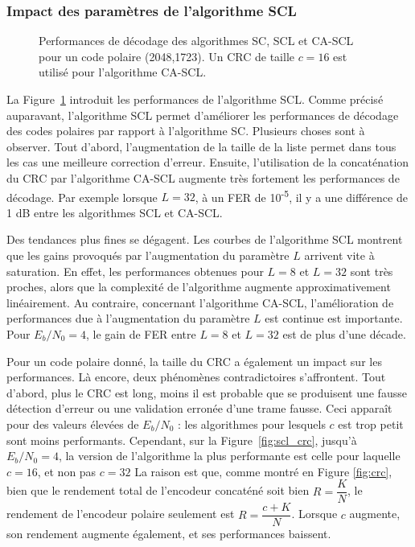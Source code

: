 \subsubsection{Impact des paramètres de l'algorithme SCL}

\begin{figure}[ht]
  \centering
  
  \caption{Performances de décodage des algorithmes SC, SCL et CA-SCL pour un code polaire (2048,1723). Un CRC de taille $c=16$ est utilisé pour l'algorithme CA-SCL.}
  \label{fig:scl_l}
\end{figure}
La Figure~\ref{fig:scl_l} introduit les performances de l'algorithme SCL. Comme précisé auparavant, l'algorithme SCL permet d'améliorer les performances de décodage des codes polaires par rapport à l'algorithme SC.
Plusieurs choses sont à observer. Tout d'abord, l'augmentation de la taille de la liste permet dans tous les cas une meilleure correction d'erreur. Ensuite, l'utilisation de la concaténation du CRC par l'algorithme CA-SCL augmente très fortement les performances de décodage. Par exemple lorsque $L=32$, à un FER de 10\textsuperscript{-5}, il y a une différence de 1 dB entre les algorithmes SCL et CA-SCL.

Des tendances plus fines se dégagent. Les courbes de l'algorithme SCL montrent que les gains provoqués par l'augmentation du paramètre $L$ arrivent vite à saturation. En effet, les performances obtenues pour $L=8$ et $L=32$ sont très proches, alors que la complexité de l'algorithme augmente approximativement linéairement. Au contraire, concernant l'algorithme CA-SCL, l'amélioration de performances due à l'augmentation du paramètre $L$ est continue est importante. Pour $E_b/N_0=4$, le gain de FER entre $L=8$ et $L=32$ est de plus d'une décade.

Pour un code polaire donné, la taille du CRC a également un impact sur les performances. Là encore, deux phénomènes contradictoires s'affrontent. 
Tout d'abord, plus le CRC est long, moins il est probable que se produisent une fausse détection d'erreur ou une validation erronée d'une trame fausse. Ceci apparaît pour des valeurs élevées de $E_b/N_0$ : les algorithmes pour lesquels $c$ est trop petit sont moins performants.
Cependant, sur la Figure~\ref{fig:scl_crc}, jusqu'à $E_b/N_0=4$, la version de l'algorithme la plus performante est celle pour laquelle $c=16$, et non pas $c=32$
La raison est que, comme montré en Figure \ref{fig:crc}, bien que le rendement total de l'encodeur concaténé soit bien $R=\dfrac{K}{N}$, le rendement de l'encodeur polaire seulement est $R=\dfrac{c+K}{N}$. Lorsque $c$ augmente, son rendement augmente également, et ses performances baissent.

